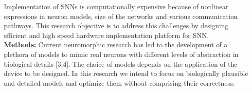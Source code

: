 \documentclass[12pt,oneside]{book}
\begin{document}
 Implementation of SNNs is computationally expensive because of
nonlinear expressions in neuron models, size of the networks
and various communication pathways.
 This research objective is to address this challenges by designing efficient and high speed hardware implementation platform for SNN.
\\ [0.2cm]
{\bf Methods: }
%
%
%
%
Current neuromorphic research has led to the development of a plethora of models to mimic real neurons with different levels of abstraction in biological details [3,4]. 
The choice of models depends
on the application of the device to be designed. 
 In this research we intend to focus on
biologically plausible and detailed models and optimize them without comprising their  correctness.  
\end{document}
